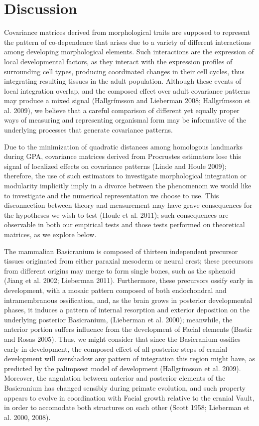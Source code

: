 \documentclass[12pt,]{article}
\begin{document}
\section{Discussion}\label{discussion}

Covariance matrices derived from morphological traits are supposed to
represent the pattern of co-dependence that arises due to a variety of
different interactions among developing morphological elements. Such
interactions are the expression of local developmental factors, as they
interact with the expression profiles of surrounding cell types,
producing coordinated changes in their cell cycles, thus integrating
resulting tissues in the adult population. Although these events of
local integration overlap, and the composed effect over adult covariance
patterns may produce a mixed signal (Hallgrímsson and Lieberman 2008;
Hallgrímsson et al. 2009), we believe that a careful comparison of
different yet equally proper ways of measuring and representing
organismal form may be informative of the underlying processes that
generate covariance patterns.

Due to the minimization of quadratic distances among homologous
landmarks during GPA, covariance matrices derived from Procrustes
estimators lose this signal of localized effects on covariance patterns
(Linde and Houle 2009); therefore, the use of such estimators to
investigate morphological integration or modularity implicitly imply in
a divorce between the phenomenom we would like to investigate and the
numerical representation we choose to use. This disconnection between
theory and measurement may have grave consequences for the hypotheses we
wish to test (Houle et al. 2011); such consequences are observable in
both our empirical tests and those tests performed on theoretical
matrices, as we explore below.

The mammalian Basicranium is composed of thirteen independent precursor
tissues originated from either paraxial mesoderm or neural crest; these
precursors from different origins may merge to form single bones, such
as the sphenoid (Jiang et al. 2002; Lieberman 2011). Furthermore, these
precursors ossify early in development, with a mosaic pattern composed
of both endochondral and intramembranous ossification, and, as the brain
grows in posterior developmental phases, it induces a pattern of
internal resorption and exterior deposition on the underlying posterior
Basicranium, (Lieberman et al. 2000); meanwhile, the anterior portion
suffers influence from the development of Facial elements (Bastir and
Rosas 2005). Thus, we might consider that since the Basicranium ossifies
early in development, the composed effect of all posterior steps of
cranial development will overshadow any pattern of integration this
region might have, as predicted by the palimpsest model of development
(Hallgrímsson et al. 2009). Moreover, the angulation between anterior
and posterior elements of the Basicranium has changed sensibly during
primate evolution, and such property appears to evolve in coordination
with Facial growth relative to the cranial Vault, in order to accomodate
both structures on each other (Scott 1958; Lieberman et al. 2000, 2008).
\end{document}
